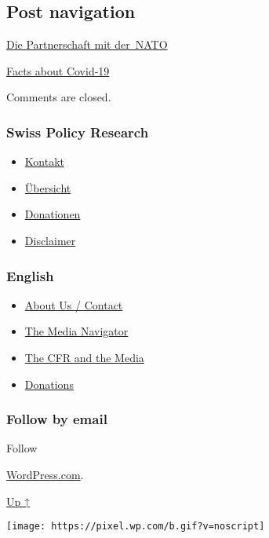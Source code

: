 \hypertarget{post-navigation}{%
\subsection{Post navigation}\label{post-navigation}}

\href{https://swprs.org/2017/03/01/schweizer-medien-nato/}{Die
Partnerschaft mit der~NATO}

\href{https://swprs.org/2018/10/01/covid-19-hinweis-ii/}{Facts about
Covid-19}

Comments are closed.

\hypertarget{swiss-policy-research}{%
\subsubsection{Swiss Policy Research}\label{swiss-policy-research}}

\begin{itemize}
\tightlist
\item
  \href{https://swprs.org/kontakt/}{Kontakt}
\item
  \href{https://swprs.org/uebersicht/}{Übersicht}
\item
  \href{https://swprs.org/donationen/}{Donationen}
\item
  \href{https://swprs.org/disclaimer/}{Disclaimer}
\end{itemize}

\hypertarget{english}{%
\subsubsection{English}\label{english}}

\begin{itemize}
\tightlist
\item
  \href{https://swprs.org/contact/}{About Us / Contact}
\item
  \href{https://swprs.org/media-navigator/}{The Media Navigator}
\item
  \href{https://swprs.org/the-american-empire-and-its-media/}{The CFR
  and the Media}
\item
  \href{https://swprs.org/donations/}{Donations}
\end{itemize}

\hypertarget{follow-by-email}{%
\subsubsection{Follow by email}\label{follow-by-email}}

Follow

\href{https://wordpress.com/?ref=footer_custom_com}{WordPress.com}.

\protect\hyperlink{}{Up ↑}

\texttt{[image: https://pixel.wp.com/b.gif?v=noscript]}
